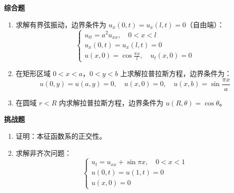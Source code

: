 \textbf{综合题}

\begin{enumerate}[resume]
    \item 求解有界弦振动，边界条件为 $u_x(0, t) = u_x(l, t) = 0$（自由端）：
    \begin{equation}
        \begin{cases}
            u_{tt} = a^2 u_{xx}, \quad 0 < x < l \\
            u_x(0, t) = u_x(l, t) = 0 \\
            u(x, 0) = \cos\frac{\pi x}{l}, \quad u_t(x, 0) = 0
        \end{cases}
    \end{equation}
    
    \item 在矩形区域 $0 < x < a$，$0 < y < b$ 上求解拉普拉斯方程，边界条件为：
    \begin{equation}
        u(0, y) = u(a, y) = 0, \quad u(x, 0) = 0, \quad u(x, b) = \sin\frac{\pi x}{a}
    \end{equation}
    
    \item 在圆域 $r < R$ 内求解拉普拉斯方程，边界条件为 $u(R, \theta) = \cos\theta$。
\end{enumerate}

\textbf{挑战题}

\begin{enumerate}[resume]
    \item 证明：本征函数系的正交性。
    
    \item 求解非齐次问题：
    \begin{equation}
        \begin{cases}
            u_t = u_{xx} + \sin\pi x, \quad 0 < x < 1 \\
            u(0, t) = u(1, t) = 0 \\
            u(x, 0) = 0
        \end{cases}
    \end{equation}
\end{enumerate}
